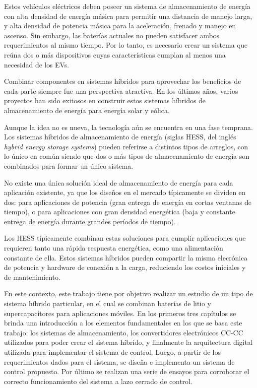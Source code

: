 Estos vehículos eléctricos deben poseer un sistema de almacenamiento de energía con alta densidad de energía másica para permitir una distancia de manejo larga, y alta densidad de potencia másica para la aceleración, frenado y manejo en ascenso. Sin embargo, las baterías actuales no pueden satisfacer ambos requerimientos al mismo tiempo. Por lo tanto, es necesario crear un sistema que reúna dos o más dispositivos cuyas características cumplan al menos una necesidad de los EVs. \cite{hessinev}

Combinar componentes en sistemas híbridos para aprovechar los beneficios de cada parte siempre fue una perspectiva atractiva. En los últimos años, varios proyectos han sido exitosos en construir estos sistemas híbridos de almacenamiento de energía para energía solar y eólica.

Aunque la idea no es nueva, la tecnología aún se encuentra en una fase temprana. Los sistemas híbridos de almacenamiento de energía (siglas HESS, del inglés \emph{hybrid energy storage systems}) pueden referirse a distintos tipos de arreglos, con lo único en común siendo que dos o más tipos de almacenamiento de energía son combinados para formar un único sistema.

No existe una única solución ideal de almacenamiento de energía para cada aplicación existente, ya que los diseños en el mercado típicamente se dividen en dos: para aplicaciones de potencia (gran entrega de energía en cortas ventanas de tiempo), o para aplicaciones con gran densidad energética (baja y constante entrega de energía durante grandes períodos de tiempo).

Los HESS típicamente combinan estas soluciones para cumplir aplicaciones que requieren tanto una rápida respuesta energética, como una alimentación constante de ella. Estos sistemas híbridos pueden compartir la misma elecrónica de potencia y hardware de conexión a la carga, reduciendo los costos iniciales y de mantenimiento.

En este contexto, este trabajo tiene por objetivo realizar un estudio de un tipo de sistema híbrido particular, en el cual se combinan baterías de litio y supercapacitores para aplicaciones móviles. En los primeros tres capítulos se brinda una introducción a los elementos fundamentales en los que se basa este trabajo: los sistemas de almacenamiento, los convertidores electrónicos CC-CC utilizados para poder crear el sistema híbrido, y finalmente la arquitectura digital utilizada para implementar el sistema de control. Luego, a partir de los requerimientos dados para el sistema, se diseña e implementa un sistema de control propuesto. Por último se realizan una serie de ensayos para corroborar el correcto funcionamiento del sistema a lazo cerrado de control. 

\newpage